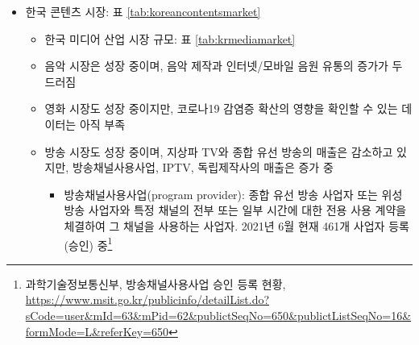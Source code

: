 \begin{itemize}
\item 한국 콘텐츠 시장: 표 \ref{tab:koreancontentsmarket}
	\begin{itemize}
	\item 한국 미디어 산업 시장 규모: 표 \ref{tab:krmediamarket}
	\item 음악 시장은 성장 중이며, 음악 제작과 인터넷/모바일 음원 유통의 증가가 두드러짐
	\item 영화 시장도 성장 중이지만, 코로나19 감염증 확산의 영향을 확인할 수 있는 데이터는 아직 부족
	\item 방송 시장도 성장 중이며, 지상파 TV와 종합 유선 방송의 매출은 감소하고 있지만, 방송채널사용사업, IPTV, 독립제작사의 매출은 증가 중
		\begin{itemize}
		\item 방송채널사용사업(program provider): 종합 유선 방송 사업자 또는 위성 방송 사업자와 특정 채널의 전부 또는 일부 시간에 대한 전용 사용 계약을 체결하여 그 채널을 사용하는 사업자. 2021년 6월 현재 461개 사업자 등록(승인) 중\footnote{과학기술정보통신부, 방송채널사용사업 승인 등록 현황, \url{https://www.msit.go.kr/publicinfo/detailList.do?sCode=user&mId=63&mPid=62&publictSeqNo=650&publictListSeqNo=16&formMode=L&referKey=650}}
		\end{itemize}


\end{itemize}
\end{itemize}
